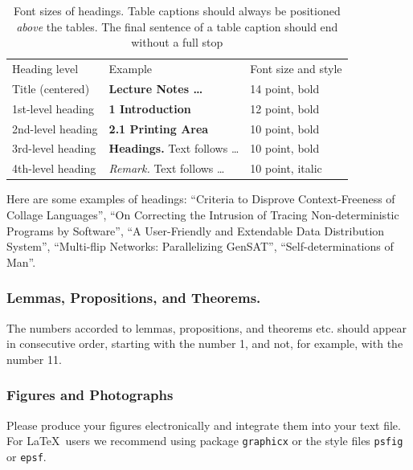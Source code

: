 \begin{table}
\begin{center}
\caption{Font sizes of headings. Table captions should always be
positioned {\it above} the tables. The final sentence of a table
caption should end without a full stop}
\label{table:headings}
\begin{tabular}{lll}
\hline\noalign{\smallskip}
Heading level & Example & Font size and style\\
\noalign{\smallskip}
\hline
\noalign{\smallskip}
Title (centered)  & {\Large \bf Lecture Notes \dots} & 14 point, bold\\
1st-level heading & {\large \bf 1 Introduction} & 12 point, bold\\
2nd-level heading & {\bf 2.1 Printing Area} & 10 point, bold\\
3rd-level heading & {\bf Headings.} Text follows \dots & 10 point, bold
\\
4th-level heading & {\it Remark.} Text follows \dots & 10 point,
italic\\
\hline
\end{tabular}
\end{center}
\end{table}
\setlength{\tabcolsep}{1.4pt}

Here are some examples of headings: ``Criteria to Disprove Context-Freeness of Collage Languages'', ``On Correcting the Intrusion of Tracing Non-deterministic Programs by Software'', ``A User-Friendly and Extendable Data Distribution System'', ``Multi-flip Networks: Parallelizing GenSAT'', ``Self-determinations of Man''.

\subsubsection{Lemmas, Propositions, and Theorems.}

The numbers accorded to lemmas, propositions, and theorems etc. should appear in consecutive order, starting with the number 1, and not, for example, with the number 11.

\subsubsection{Figures and Photographs}
\label{sect:figures}

Please produce your figures electronically and integrate
them into your text file. For \LaTeX\ users we recommend using package \verb+graphicx+ or the style files \verb+psfig+ or \verb+epsf+.

